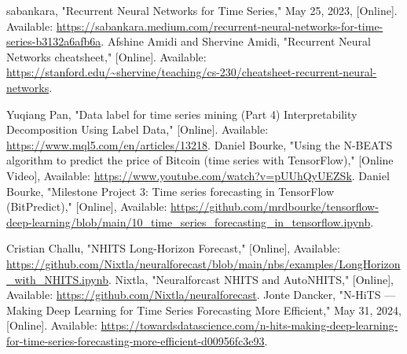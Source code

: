 \begin{thebibliography}{00}
     sabankara, "Recurrent Neural Networks for Time Series," May 25, 2023, [Online]. Available: \url{https://sabankara.medium.com/recurrent-neural-networks-for-time-series-b3132a6afb6a}.
     Afshine Amidi and Shervine Amidi, "Recurrent Neural Networks cheatsheet," [Online]. Available: \url{https://stanford.edu/~shervine/teaching/cs-230/cheatsheet-recurrent-neural-networks}.

     Yuqiang Pan, "Data label for time series mining (Part 4) Interpretability Decomposition Using Label Data," [Online]. Available: \url{https://www.mql5.com/en/articles/13218}.
     Daniel Bourke, "Using the N-BEATS algorithm to predict the price of Bitcoin (time series with TensorFlow)," [Online Video], Available: \url{https://www.youtube.com/watch?v=pUUhQyUEZSk}.
     Daniel Bourke, "Milestone Project 3: Time series forecasting in TensorFlow (BitPredict)," [Online], Available: \url{https://github.com/mrdbourke/tensorflow-deep-learning/blob/main/10_time_series_forecasting_in_tensorflow.ipynb}.

     Cristian Challu, "NHITS Long-Horizon Forecast," [Online], Available: \url{https://github.com/Nixtla/neuralforecast/blob/main/nbs/examples/LongHorizon_with_NHITS.ipynb}.
     Nixtla, "Neuralforcast NHITS and AutoNHITS," [Online], Available: \url{https://github.com/Nixtla/neuralforecast}.
     Jonte Dancker, "N-HiTS — Making Deep Learning for Time Series Forecasting More Efficient," May 31, 2024, [Online]. Available: \url{https://towardsdatascience.com/n-hits-making-deep-learning-for-time-series-forecasting-more-efficient-d00956fc3e93}.

    \end{thebibliography}
